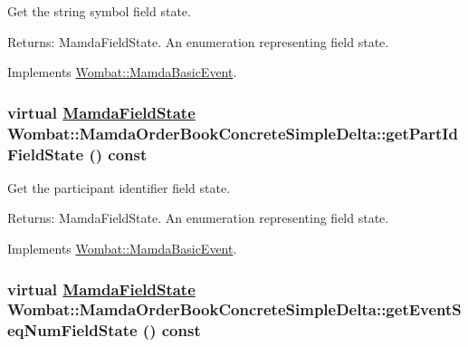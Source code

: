 Get the string symbol field state. 

\begin{Desc}
\item[Returns:]Mamda\-Field\-State. An enumeration representing field state. \end{Desc}


Implements \hyperlink{classWombat_1_1MamdaBasicEvent_ef95e19f4babb0e5ea8549d6cf29d13f}{Wombat::Mamda\-Basic\-Event}.\hypertarget{classWombat_1_1MamdaOrderBookConcreteSimpleDelta_4a217a14e0da5dba63b9cea51b53f513}{
\subsubsection[getPartIdFieldState]{\setlength{\rightskip}{0pt plus 5cm}virtual \hyperlink{namespaceWombat_93aac974f2ab713554fd12a1fa3b7d2a}{Mamda\-Field\-State} Wombat::Mamda\-Order\-Book\-Concrete\-Simple\-Delta::get\-Part\-Id\-Field\-State () const}}
\label{classWombat_1_1MamdaOrderBookConcreteSimpleDelta_4a217a14e0da5dba63b9cea51b53f513}


Get the participant identifier field state. 

\begin{Desc}
\item[Returns:]Mamda\-Field\-State. An enumeration representing field state. \end{Desc}


Implements \hyperlink{classWombat_1_1MamdaBasicEvent_c361c99af2cf7eb9f5621d89f744fc62}{Wombat::Mamda\-Basic\-Event}.\hypertarget{classWombat_1_1MamdaOrderBookConcreteSimpleDelta_cb5617269c6616eacf33355531a1306d}{
\subsubsection[getEventSeqNumFieldState]{\setlength{\rightskip}{0pt plus 5cm}virtual \hyperlink{namespaceWombat_93aac974f2ab713554fd12a1fa3b7d2a}{Mamda\-Field\-State} Wombat::Mamda\-Order\-Book\-Concrete\-Simple\-Delta::get\-Event\-Seq\-Num\-Field\-State () const}}
\label{classWombat_1_1MamdaOrderBookConcreteSimpleDelta_cb5617269c6616eacf33355531a1306d}


